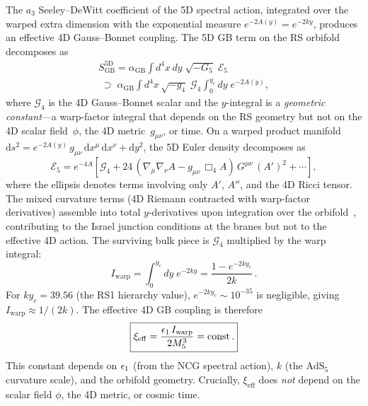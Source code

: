 The $a_3$ Seeley--DeWitt coefficient of the 5D spectral action, integrated over the warped extra dimension with the exponential measure $e^{-2A(y)} = e^{-2ky}$, produces an effective 4D Gauss--Bonnet coupling. The 5D GB term on the RS orbifold decomposes as
\begin{multline}
\label{eq:1-gb-kk-decomp}
S_{\mathrm{GB}}^{5\mathrm{D}} = \alpha_{\mathrm{GB}} \!\int\! d^4x\, dy\; \sqrt{-G_5}\; \mathcal{E}_5 \\
  \;\supset\; \alpha_{\mathrm{GB}} \!\int\! d^4x\, \sqrt{-g_4}\; \mathcal{G}_4 \!\int_0^{y_c}\! dy\; e^{-2A(y)},
\end{multline}
where $\mathcal{G}_4$ is the 4D Gauss--Bonnet scalar and the $y$-integral is a \emph{geometric constant}---a warp-factor integral that depends on the RS geometry but not on the 4D scalar field~$\phi$, the 4D metric~$g_{\mu\nu}$, or time. On a warped product manifold $\mathrm{d}s^2 = e^{-2A(y)}\,g_{\mu\nu}\,\mathrm{d}x^\mu\,\mathrm{d}x^\nu + \mathrm{d}y^2$, the 5D Euler density decomposes as~\cite{ch1:charmousis-dufaux2002}
\begin{equation}
\label{eq:1-e5-decomposition}
\mathcal{E}_5 = e^{-4A}\!\left[\mathcal{G}_4 + 24\,(\nabla_\mu\nabla_\nu A - g_{\mu\nu}\,\Box_4 A)\,G^{\mu\nu}\,(A')^2 + \cdots\right],
\end{equation}
where the ellipsis denotes terms involving only $A'$, $A''$, and the 4D Ricci tensor. The mixed curvature terms (4D Riemann contracted with warp-factor derivatives) assemble into total $y$-derivatives upon integration over the orbifold~\cite{ch1:davis2002}, contributing to the Israel junction conditions at the branes but not to the effective 4D action. The surviving bulk piece is $\mathcal{G}_4$ multiplied by the warp integral:
\begin{equation}
\label{eq:1-Iwarp}
I_{\mathrm{warp}} = \int_0^{y_c} dy\; e^{-2ky} = \frac{1 - e^{-2ky_c}}{2k}\,.
\end{equation}
For $ky_c = 39.56$ (the RS1 hierarchy value), $e^{-2ky_c} \sim 10^{-35}$ is negligible, giving $I_{\mathrm{warp}} \approx 1/(2k)$. The effective 4D GB coupling is therefore
\begin{equation}
\label{eq:1-xieff}
\boxed{\xi_{\mathrm{eff}} = \frac{\epsilon_1\, I_{\mathrm{warp}}}{2M_5^3} = \mathrm{const}\,.}
\end{equation}
This constant depends on $\epsilon_1$ (from the NCG spectral action), $k$ (the $\mathrm{AdS}_5$ curvature scale), and the orbifold geometry. Crucially, $\xi_{\mathrm{eff}}$ does \emph{not} depend on the scalar field $\phi$, the 4D metric, or cosmic time.

